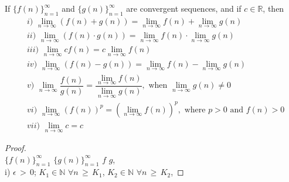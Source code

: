 \begin{theorem}
If $\{f(n)\}_{n=1}^{\infty}$ and $\{g(n)\}_{n=1}^{\infty}$ are convergent sequences, and if $c \in \mathbb{R}$, then
\begin{align*}
    &i) \hspace{4pt} \lim_{n \longrightarrow \infty} (f(n) + g(n)) = \lim_{n \longrightarrow \infty} f(n) + \lim_{n \longrightarrow \infty} g(n) \\[2ex]
    &ii) \hspace{4pt} \lim_{n \longrightarrow \infty} (f(n) \cdot g(n)) = \lim_{n \longrightarrow \infty} f(n) \cdot \lim_{n \longrightarrow \infty} g(n)\\[2ex]
    &iii) \hspace{4pt} \lim_{n \longrightarrow \infty} cf(n) = c\lim_{n \longrightarrow \infty} f(n)\\[2ex]
    &iv) \hspace{4pt} \lim_{n \longrightarrow \infty}(f(n) - g(n)) = \lim_{n \longrightarrow \infty} f(n) - \lim_{n \longrightarrow \infty} g(n)\\[2ex]
    &v) \hspace{4pt} \lim_{n \longrightarrow \infty}\dfrac{f(n)}{g(n)} = \dfrac{\lim_{n \longrightarrow \infty} f(n)}{\lim_{n \longrightarrow \infty} g(n)}, \hspace{4pt} \text{when} \hspace{4pt} \lim_{n \longrightarrow \infty} g(n) \neq 0\\[2ex]
    &vi) \hspace{4pt} \lim_{n \longrightarrow \infty} (f(n))^{p} = (\lim_{n \longrightarrow \infty} f(n))^{p}, \hspace{4pt} \text{where} \hspace{4pt} p > 0 \hspace{4pt} \text{and} \hspace{4pt} f(n) > 0\\[2ex]
    &vii) \hspace{4pt} \lim_{n \longrightarrow \infty} c = c
\end{align*}
\label{properties_limit_sequence_numbers}
\newpage
\begin{proof} 
    \\[1ex]
     $\{f(n)\}_{n = 1}^{\infty}$  $\{g(n)\}_{n = 1}^{\infty}$  $f$  $g$, \\
    i)  $\epsilon \hspace{2pt} > \hspace{2pt} 0$;  $K_{1} \in \mathbb{N}$  $\forall n \hspace{2pt} \geq \hspace{2pt} K_{1}$,  $K_{2} \in \mathbb{N}$  $\forall n \hspace{2pt} \geq \hspace{2pt} K_{2}$, 

\end{proof}
\end{theorem}
